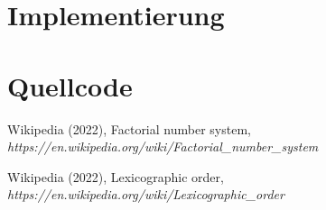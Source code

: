 \documentclass[a4paper, 11pt, ngerman]{article}
\begin{document}
\section{Implementierung}

\section{Quellcode}

\begin{thebibliography}{2}
    Wikipedia (2022),
    Factorial number system,
    \emph{https://en.wikipedia.org/wiki/Factorial\_number\_system}

    Wikipedia (2022),
    Lexicographic order,
    \emph{https://en.wikipedia.org/wiki/Lexicographic\_order}

\end{thebibliography}
\end{document}
